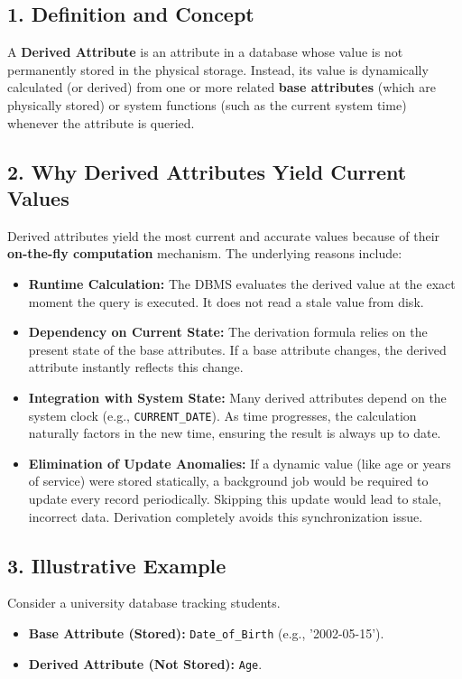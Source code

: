 \documentclass[12pt,a3paper]{article}
\begin{document}
\begin{enumerate}
\begin{tcolorbox}[enhanced,breakable,ansbox,colback=cA!4,colframe=cA,boxrule=0.8pt,arc=5pt,title={\textbf{Answer}},fonttitle=\bfseries\color{white},colbacktitle=cA]
\subsection*{1. Definition and Concept}

A \textbf{Derived Attribute} is an attribute in a database whose value is not permanently stored in the physical storage. Instead, its value is dynamically calculated (or derived) from one or more related \textbf{base attributes} (which are physically stored) or system functions (such as the current system time) whenever the attribute is queried.

\subsection*{2. Why Derived Attributes Yield Current Values}

Derived attributes yield the most current and accurate values because of their \textbf{on-the-fly computation} mechanism. The underlying reasons include:

\begin{itemize}
    \item \textbf{Runtime Calculation:} The DBMS evaluates the derived value at the exact moment the query is executed. It does not read a stale value from disk.
    \item \textbf{Dependency on Current State:} The derivation formula relies on the present state of the base attributes. If a base attribute changes, the derived attribute instantly reflects this change.
    \item \textbf{Integration with System State:} Many derived attributes depend on the system clock (e.g., \texttt{CURRENT\_DATE}). As time progresses, the calculation naturally factors in the new time, ensuring the result is always up to date.
    \item \textbf{Elimination of Update Anomalies:} If a dynamic value (like age or years of service) were stored statically, a background job would be required to update every record periodically. Skipping this update would lead to stale, incorrect data. Derivation completely avoids this synchronization issue.
\end{itemize}

\subsection*{3. Illustrative Example}

Consider a university database tracking students. 
\begin{itemize}
    \item \textbf{Base Attribute (Stored):} \texttt{Date\_of\_Birth} (e.g., '2002-05-15').
    \item \textbf{Derived Attribute (Not Stored):} \texttt{Age}.
\end{itemize}


\end{tcolorbox}
\end{enumerate}
\end{document}
